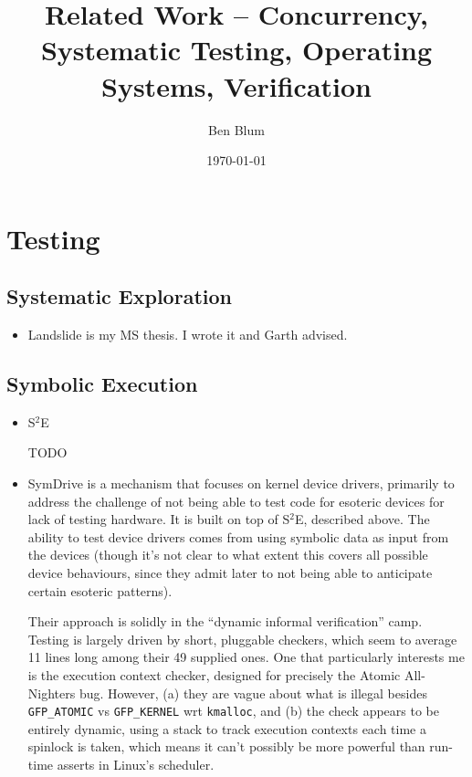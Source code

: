 \documentclass{article}
\begin{document}

\title{Related Work -- Concurrency, Systematic Testing, Operating Systems, Verification}
\author{Ben Blum}
\date{\today}
\maketitle


\section{Testing}

\subsection{Systematic Exploration}
\begin{itemize}
	\item Landslide \cite{Landslide} is my MS thesis. I wrote it and Garth advised.
\end{itemize}

\subsection{Symbolic Execution}
\begin{itemize}
	\item S$^2$E \cite{s2e}

		TODO

	\item SymDrive \cite{symdrive} is a mechanism that focuses on kernel device drivers, primarily to address the challenge of not being able to test code for esoteric devices for lack of testing hardware. It is built on top of S$^2$E, described above.
		The ability to test device drivers comes from using symbolic data as input from the devices (though it's not clear to what extent this covers all possible device behaviours, since they admit later to not being able to anticipate certain esoteric patterns).

		Their approach is solidly in the ``dynamic informal verification'' camp. Testing is largely driven by short, pluggable checkers, which seem to average 11 lines long among their 49 supplied ones. One that particularly interests me is the execution context checker, designed for precisely the Atomic All-Nighters bug. However, (a) they are vague about what is illegal besides {\tt GFP\_ATOMIC} vs {\tt GFP\_KERNEL} wrt {\tt kmalloc}, and (b) the check appears to be entirely dynamic, using a stack to track execution contexts each time a spinlock is taken, which means it can't possibly be more powerful than run-time asserts in Linux's scheduler.
\end{itemize}
\end{document}
